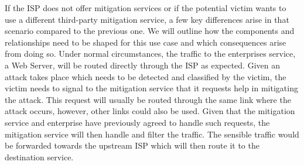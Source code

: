 If the ISP does not offer mitigation services or if the potential victim wants to use a different third-party mitigation service, a few key differences arise in that scenario compared to the previous one. We will outline how the components and relationships need to be shaped for this use case and which consequences arise from doing so. Under normal circumstances, the traffic to the enterprises service,  a Web Server, will be routed directly through the ISP as expected. Given an attack takes place which needs to be detected and classified by the victim, the victim needs to signal to the mitigation service that it requests help in mitigating the attack. This request will usually be routed through the same link where the attack occurs, however, other links could also be used. Given that the mitigation service and enterprise have previously agreed to handle such requests, the mitigation service will then handle and filter the traffic. The sensible traffic would be forwarded towards the upstream ISP which will then route it to the destination service. 

